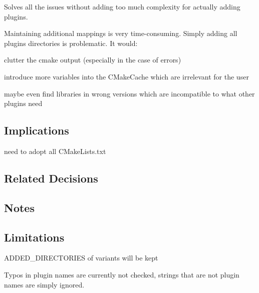 Solves all the issues without adding too much complexity for actually adding plugins.

Maintaining additional mappings is very time-\/consuming. Simply adding all plugins directories is problematic. It would\+:


\begin{DoxyItemize}
\item clutter the cmake output (especially in the case of errors)
\item introduce more variables into the C\+Make\+Cache which are irrelevant for the user
\item maybe even find libraries in wrong versions which are incompatible to what other plugins need
\end{DoxyItemize}

\subsection*{Implications}


\begin{DoxyItemize}
\item need to adopt all C\+Make\+Lists.\+txt
\end{DoxyItemize}

\subsection*{Related Decisions}

\subsection*{Notes}

\subsection*{Limitations}


\begin{DoxyItemize}
\item {\ttfamily A\+D\+D\+E\+D\+\_\+\+D\+I\+R\+E\+C\+T\+O\+R\+I\+ES} of variants will be kept
\item Typos in plugin names are currently not checked, strings that are not plugin names are simply ignored. 
\end{DoxyItemize}